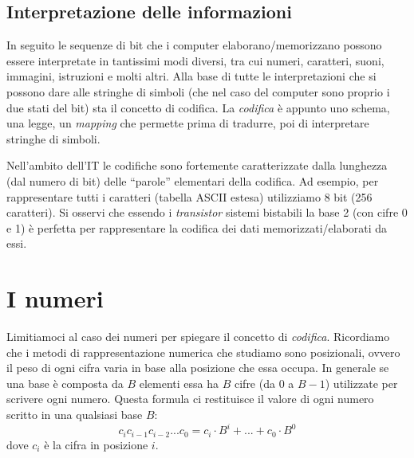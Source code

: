 \documentclass[class=book, crop=false, oneside]{standalone}
\begin{document}
\subsection{Interpretazione delle informazioni} In seguito le sequenze di bit che i computer elaborano/memorizzano possono essere interpretate in tantissimi modi diversi, tra cui numeri, caratteri, suoni, immagini, istruzioni e molti altri. Alla base di tutte le interpretazioni che si possono dare alle stringhe di simboli (che nel caso del computer sono proprio i due stati del bit) sta il concetto di codifica. La \emph{codifica} è appunto uno schema, una legge, un \emph{mapping} che permette prima di tradurre, poi di interpretare stringhe di simboli.

Nell’ambito dell’IT le codifiche sono fortemente caratterizzate dalla lunghezza (dal numero di bit) delle “parole” elementari della codifica. Ad esempio, per rappresentare tutti i caratteri (tabella ASCII estesa) utilizziamo  8 bit (256 caratteri). Si osservi che essendo i \emph{transistor} sistemi bistabili la base 2 (con cifre 0 e 1) è perfetta per rappresentare la codifica dei dati memorizzati/elaborati da essi.

\section{I numeri}
Limitiamoci al caso dei numeri per spiegare il concetto di \emph{codifica}. Ricordiamo che i metodi di rappresentazione numerica che studiamo sono posizionali, ovvero il peso di ogni cifra varia in base alla posizione che essa occupa. In generale se una base è composta da \(B\) elementi essa ha \(B\) cifre (da 0 a \(B-1\)) utilizzate per scrivere ogni numero. Questa formula ci restituisce il valore di ogni numero scritto in una qualsiasi base \(B\):
\begin{equation*}
	c_{i} c_{i-1} c_{i-2}... c_{0}=c_{i}\cdot B^{i}+...+c_{0}\cdot B^{0}
\end{equation*}
dove \(c_{i}\) è la cifra in posizione \(i\).
\end{document}
